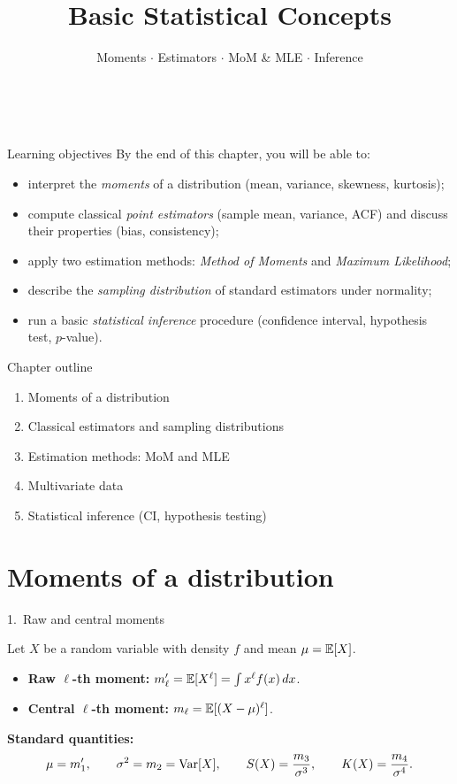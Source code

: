 \documentclass[aspectratio=169]{beamer}
\title[\moduleNom\ -- Ch.1]{Basic Statistical Concepts}
\subtitle{Moments $\cdot$ Estimators $\cdot$ MoM \& MLE $\cdot$ Inference}
\author{\auteurNom \\ \footnotesize\auteurEmail}
\institute{\auteurInstitution}
\date{\anneeUniversitaire}
\begin{document}
\begin{frame}\titlepage\end{frame}

\begin{frame}{Learning objectives}
  By the end of this chapter, you will be able to:
  \begin{itemize}
    \item interpret the \emph{moments} of a distribution
          (mean, variance, skewness, kurtosis);
    \item compute classical \emph{point estimators} (sample mean,
          variance, ACF) and discuss their properties (bias, consistency);
    \item apply two estimation methods: \emph{Method of Moments} and
          \emph{Maximum Likelihood};
    \item describe the \emph{sampling distribution} of standard
          estimators under normality;
    \item run a basic \emph{statistical inference} procedure
          (confidence interval, hypothesis test, $p$-value).
  \end{itemize}
\end{frame}

\begin{frame}{Chapter outline}
  \begin{enumerate}
    \item Moments of a distribution
    \item Classical estimators and sampling distributions
    \item Estimation methods: MoM and MLE
    \item Multivariate data
    \item Statistical inference (CI, hypothesis testing)
  \end{enumerate}
\end{frame}

\section{Moments of a distribution}

\begin{frame}{1.~Raw and central moments}
  \begin{defbox}[Moments]
    Let $X$ be a random variable with density $f$ and mean
    $\mu = \mathbb{E}[X]$.
    \begin{itemize}
      \item \textbf{Raw $\ell$-th moment:}
            $m'_\ell = \mathbb{E}[X^\ell] = \int x^\ell f(x)\, dx$.
      \item \textbf{Central $\ell$-th moment:}
            $m_\ell = \mathbb{E}[(X - \mu)^\ell]$.
    \end{itemize}
  \end{defbox}
  \medskip
  \textbf{Standard quantities:}
  \[
    \mu = m'_1, \qquad
    \sigma^2 = m_2 = \mathrm{Var}[X], \qquad
    S(X) = \frac{m_3}{\sigma^3}, \qquad
    K(X) = \frac{m_4}{\sigma^4}.
  \]
\end{frame}
\end{document}
